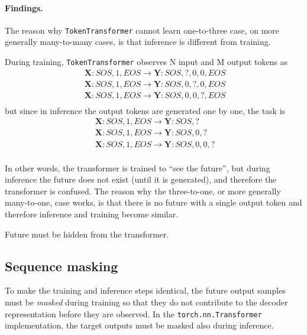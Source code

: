 \documentclass[final]{article}
\begin{document}
\paragraph{Findings.}
The reason why \texttt{TokenTransformer} cannot learn one-to-three case, on
more generally many-to-many cases, is that inference is different from
training.

During training, \texttt{TokenTransformer} observes N input and M output tokens as
\begin{displaymath}
  \begin{split}
    &\mathbf{X}: SOS,1,EOS \rightarrow \mathbf{Y}: SOS,?, 0, 0,EOS\\
    &\mathbf{X}: SOS,1,EOS \rightarrow \mathbf{Y}: SOS,0, ?, 0,EOS\\
    &\mathbf{X}: SOS,1,EOS \rightarrow \mathbf{Y}: SOS,0, 0, ?,EOS\\
  \end{split} \enspace
\end{displaymath}
but since in inference the output tokens are generated one by one, the task is
\begin{displaymath}
  \begin{split}
    &\mathbf{X}: SOS,1,EOS \rightarrow \mathbf{Y}: SOS,?\\
    &\mathbf{X}: SOS,1,EOS \rightarrow \mathbf{Y}: SOS,0, ?\\
    &\mathbf{X}: SOS,1,EOS \rightarrow \mathbf{Y}: SOS,0, 0, ?\\
  \end{split} \enspace
\end{displaymath}

In other words, the transformer is trained to ``see the future'', but during inference the future does not exist (until it is generated), and therefore the transformer is confused. The reason why the three-to-one, or more generally many-to-one, case works, is that there is no future with a single output token and therefore inference and training become similar.

Future must be hidden from the transformer.


\subsection{Sequence masking}
To make the training and inference steps identical, the future output samples must be \textit{masked} during training so that they do not contribute to the decoder representation before they are observed.
In the \texttt{torch.nn.Transformer} implementation, the target outputs must be masked also during inference.
\end{document}
